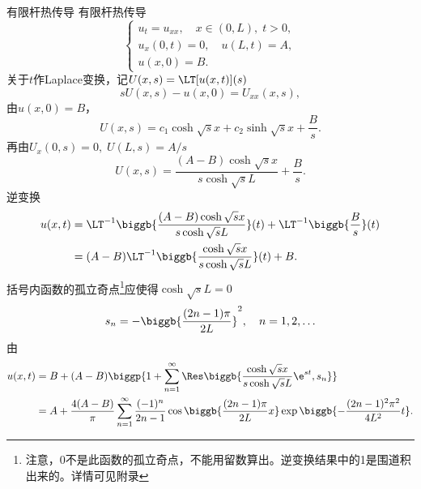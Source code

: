 \begin{example}{有限杆热传导}{}
	有限杆热传导
	\[
		\begin{cases}
			u_t=u_{xx},\quad x\in(0,L),\;t>0,     \\
			u_x(0,t)=0,\quad u(L,t)=A, \\
			u(x,0)=B.
		\end{cases}
	\]
	关于$t$作Laplace变换，记$U(x,s)=\LT[u(x,t)](s)$
	\[
		s U(x,s)-u(x,0)=U_{xx}(x,s),
	\]
	由$u(x,0)=B$，
	\[
		U(x,s)=c_1\cosh\sqrt s x+c_2\sinh\sqrt s x+\frac Bs.
	\]
	再由$U_x(0,s)=0,\;U(L,s)=A/s$
	\[
		U(x,s)=\frac{(A-B)\cosh\sqrt s x}{s\cosh\sqrt s L}+\frac Bs.
	\]
	逆变换
	\begin{align*}
		u(x,t)&=\LT^{-1}\biggb{\frac{(A-B)\cosh\sqrt s x}{s\cosh\sqrt s L}}(t)+\LT^{-1}\biggb{\frac Bs}(t)\\
		&=(A-B)\LT^{-1}\biggb{\frac{\cosh\sqrt s x}{s\cosh\sqrt s L}}(t)+B.
	\end{align*}
	括号内函数的孤立奇点\footnote{注意，0不是此函数的孤立奇点，不能用留数算出。逆变换结果中的1是围道积出来的。详情可见附录}应使得$\cosh\sqrt s L=0$
	\[
		s_n=-\biggb{\frac{(2n-1)\pi}{2L}}^2,\quad n=1,2,\ldots
	\]
	由
	\begin{align*}
		u(x,t)&=B+(A-B)\biggp{1+\sum_{n=1}^\infty\Res\biggb{\frac{\cosh\sqrt s x}{s\cosh\sqrt s L}\e^{s t},s_n}}\\
		&=A+\frac{4(A-B)}\pi\sum_{n=1}^\infty\frac{(-1)^n}{2n-1}\cos\biggb{\frac{(2n-1)\pi}{2L}x}\exp\biggb{-\frac{(2n-1)^2\pi^2}{4L^2}t}.
	\end{align*}
\end{example}
